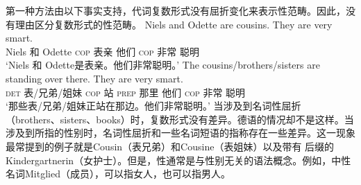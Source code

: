 第一种方法由以下事实支持，代词复数形式没有屈折变化来表示性范畴。因此，没有理由区分复数形式的性范畴。
\eal
\ex 
\gll Niels and Odette are cousins. They are very smart.\\
	Niels 和 Odette \textsc{cop} 表亲 他们 \textsc{cop} 非常 聪明\\
\glt `Niels 和 Odette是表亲。他们非常聪明。'
\ex 
\gll The cousins/brothers/sisters are standing over there. They are very smart.\\
	\textsc{det} 表/兄弟/姐妹 \textsc{cop} 站 \textsc{prep} 那里 他们 \textsc{cop} 非常 聪明\\
\glt `那些表/兄弟/姐妹正站在那边。他们非常聪明。'
\zl
当涉及到名词性屈折（brothers、sisters、books）时，复数形式没有差异。德语的情况却不是这样。当涉及到所指的性别时，名词性屈折和一些名词短语的指称存在一些差异。这一现象最常提到的例子就是Cousin（表兄弟）和Cousine（表姐妹）以及带有 后缀的Kindergartnerin（女护士）。但是，性通常是与性别无关的语法概念。例如，中性名词Mitglied（成员），可以指女人，也可以指男人。

